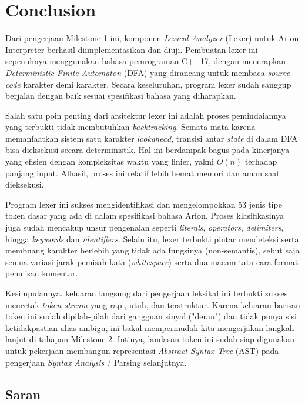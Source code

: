 \documentclass[11pt,a4paper]{article}
\begin{document}
\section{Conclusion}

Dari pengerjaan Milestone 1 ini, komponen \textit{Lexical Analyzer} (Lexer)
untuk Arion Interpreter berhasil diimplementasikan dan diuji.
Pembuatan lexer ini sepenuhnya menggunakan bahasa pemrograman C++17, dengan
menerapkan \textit{Deterministic Finite Automaton} (DFA) yang dirancang untuk
membaca \textit{source code} karakter demi karakter. Secara keseluruhan,
program lexer sudah sanggup berjalan dengan baik sesuai spesifikasi bahasa
yang diharapkan.

Salah satu poin penting dari arsitektur lexer ini adalah proses pemindaiannya
yang terbukti tidak membutuhkan \textit{backtracking}. Semata-mata karena
memanfaatkan sistem satu karakter \textit{lookahead}, transisi antar \textit{state}
di dalam DFA bisa dieksekusi secara deterministik. Hal ini berdampak bagus
pada kinerjanya yang efisien dengan kompleksitas waktu yang linier, yakni $O(n)$
terhadap panjang input. Alhasil, proses ini relatif lebih hemat memori dan aman
saat dieksekusi.

Program lexer ini sukses mengidentifikasi dan mengelompokkan 53 jenis tipe token
dasar yang ada di dalam spesifikasi bahasa Arion. Proses klasifikasinya juga
sudah mencakup unsur pengenalan seperti \textit{literals}, \textit{operators},
\textit{delimiters}, hingga \textit{keywords} dan \textit{identifiers}. Selain
itu, lexer terbukti pintar mendeteksi serta membuang karakter berlebih yang
tidak ada fungsinya (non-semantis), sebut saja semua variasi jarak pemisah kata
(\textit{whitespace}) serta dua macam tata cara format penulisan komentar.

Kesimpulannya, keluaran langsung dari pengerjaan leksikal ini terbukti sukses
mencetak \textit{token stream} yang rapi, utuh, dan terstruktur. Karena keluaran
barisan token ini sudah dipilah-pilah dari gangguan sinyal ("derau") dan tidak 
punya sisi ketidakpastian alias ambigu, ini bakal mempermudah kita mengerjakan
langkah lanjut di tahapan Milestone 2. Intinya, landasan token ini
sudah siap digunakan untuk pekerjaan membangun representasi
\textit{Abstract Syntax Tree} (AST) pada pengerjaan \textit{Syntax Analysis} /
Parsing selanjutnya.

\subsection{Saran}
\end{document}
